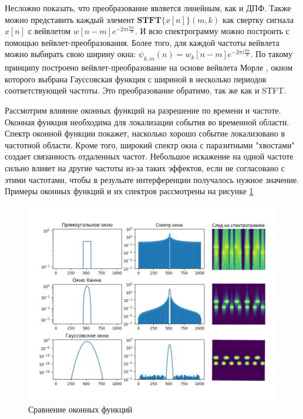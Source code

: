 Несложно показать, что преобразование является линейным, как и ДПФ.
Также можно представить каждый элемент $\textbf{STFT}\{x[n]\} (m, k)$ как свертку сигнала $x[n]$ с вейвлетом $w[n - m] e^{-2\pi i  \frac{k n}{N}}$.
И всю спектрограмму можно построить с помощью вейвлет-преобразования. Более того, для каждой частоты вейвлета можно выбирать свою ширину окна: 
$\psi_{k,m}(n) = w_k[n - m] e^{-2\pi i  \frac{k n}{N}}$. По такому принципу построено вейвлет-преобразование на основе вейвлета Морле \cite{MorleWavelet}, 
окном которого выбрана Гауссовская функция с шириной в несколько периодов соответствующей частоты. Это преобразование обратимо, так же как и STFT.

Рассмотрим влияние оконных функций на разрешение по времени и частоте. 
Оконная функция необходима для локализации события во временной области. 
Спектр оконной функции покажет, насколько хорошо событие локализовано в частотной области.
Кроме того, широкий спектр окна с паразитными "хвостами" создает связанность отдаленных частот. 
Небольшое искажение на одной частоте сильно влияет на другие частоты из-за таких эффектов, если не согласовано с этими частотами, 
чтобы в резульате интерференции получалось нужное значение. Примеры оконных функций и их спектров рассмотрены на рисунке \ref{fig:windows}

\begin{figure}[t]
  \centering
  \includegraphics[width=16cm]{figures/windows}
  \caption{Сравнение оконных функций}
  \label{fig:windows}
\end{figure}

